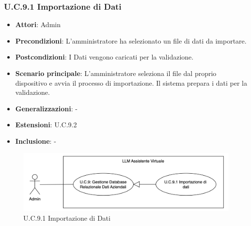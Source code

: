 \subsubsection{U.C.9.1 Importazione di Dati}
\begin{itemize}
    \item \textbf{Attori}: Admin
    \item \textbf{Precondizioni}: L'amministratore ha selezionato un file di dati da importare.
    \item \textbf{Postcondizioni}: I Dati vengono caricati per la validazione.
    \item \textbf{Scenario principale}: L'amministratore seleziona il file dal proprio dispositivo e avvia il processo di importazione. Il sistema prepara i dati per la validazione.
    \item \textbf{Generalizzazioni}: -
    \item \textbf{Estensioni}: U.C.9.2
    \item \textbf{Inclusione}: -
\end{itemize}
\begin{figure}[H]
    \centering
    \includegraphics[width=\textwidth]{img/U.C.9.1.png}
    \caption{U.C.9.1 Importazione di Dati}
\end{figure}
\newpage

